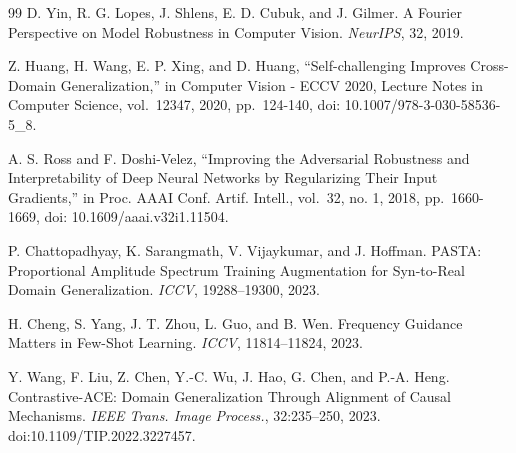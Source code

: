 \documentclass[journal,10pt,a4paper]{IEEEtran}
\begin{document}
\begin{thebibliography}{99}
D. Yin, R. G. Lopes, J. Shlens, E. D. Cubuk, and J. Gilmer. A Fourier Perspective on Model Robustness in Computer Vision. \emph{NeurIPS}, 32, 2019.

Z. Huang, H. Wang, E. P. Xing, and D. Huang, ``Self-challenging Improves Cross-Domain Generalization,'' in Computer Vision - ECCV 2020, Lecture Notes in Computer Science, vol.~12347, 2020, pp.~124-140, doi: 10.1007/978-3-030-58536-5\_8.

A. S. Ross and F. Doshi-Velez, ``Improving the Adversarial Robustness and Interpretability of Deep Neural Networks by Regularizing Their Input Gradients,'' in Proc. AAAI Conf. Artif. Intell., vol.~32, no. 1, 2018, pp.~1660-1669, doi: 10.1609/aaai.v32i1.11504.

P. Chattopadhyay, K. Sarangmath, V. Vijaykumar, and J. Hoffman. PASTA: Proportional Amplitude Spectrum Training Augmentation for Syn-to-Real Domain Generalization. \emph{ICCV}, 19288--19300, 2023.

H. Cheng, S. Yang, J. T. Zhou, L. Guo, and B. Wen. Frequency Guidance Matters in Few-Shot Learning. \emph{ICCV}, 11814--11824, 2023.

Y. Wang, F. Liu, Z. Chen, Y.-C. Wu, J. Hao, G. Chen, and P.-A. Heng. Contrastive-ACE: Domain Generalization Through Alignment of Causal Mechanisms. \emph{IEEE Trans. Image Process.}, 32:235--250, 2023. doi:10.1109/TIP.2022.3227457.
\end{thebibliography}
\end{document}
